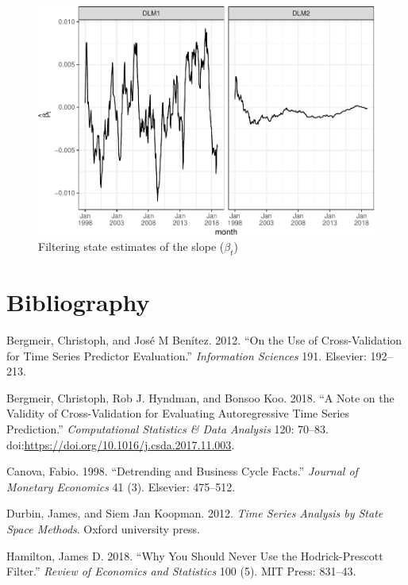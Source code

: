 \documentclass[]{article}
\begin{document}
\begin{figure}
\centering
\includegraphics{../figs/freq--trend-growth-1.pdf}
\caption{\label{fig:trend-growth}Filtering state estimates of the slope
(\(\beta_t\))}
\end{figure}

\section*{Bibliography}\label{bibliography}

\hypertarget{refs}{}
\hypertarget{ref-bergmeir2012use}{}
Bergmeir, Christoph, and José M Benítez. 2012. ``On the Use of
Cross-Validation for Time Series Predictor Evaluation.''
\emph{Information Sciences} 191. Elsevier: 192--213.

\hypertarget{ref-bergmeir2018}{}
Bergmeir, Christoph, Rob J. Hyndman, and Bonsoo Koo. 2018. ``A Note on
the Validity of Cross-Validation for Evaluating Autoregressive Time
Series Prediction.'' \emph{Computational Statistics \& Data Analysis}
120: 70--83.
doi:\href{https://doi.org/https://doi.org/10.1016/j.csda.2017.11.003}{https://doi.org/10.1016/j.csda.2017.11.003}.

\hypertarget{ref-canova1998detrending}{}
Canova, Fabio. 1998. ``Detrending and Business Cycle Facts.''
\emph{Journal of Monetary Economics} 41 (3). Elsevier: 475--512.

\hypertarget{ref-durbin2012time}{}
Durbin, James, and Siem Jan Koopman. 2012. \emph{Time Series Analysis by
State Space Methods}. Oxford university press.

\hypertarget{ref-hamilton2018}{}
Hamilton, James D. 2018. ``Why You Should Never Use the Hodrick-Prescott
Filter.'' \emph{Review of Economics and Statistics} 100 (5). MIT Press:
831--43.
\end{document}
